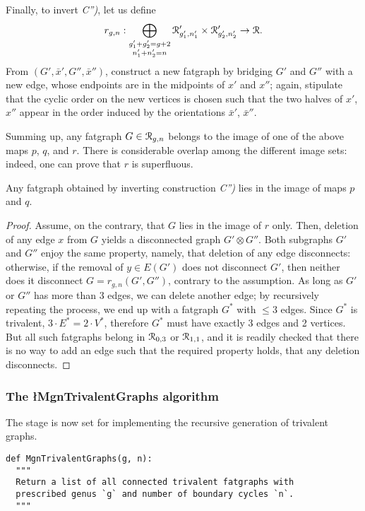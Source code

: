 Finally, to invert {\sl C'')}, let us define
\begin{equation*}
r_{g,n}: \bigoplus_{\substack{g'_1+g'_2=g+2 \\ n'_1+n'_2=n}} 
\mathcal{R}'_{g'_1, n'_1} \times \mathcal{R}'_{g'_2, n'_2} \to \mathcal{R}.
\end{equation*}
From $(G', \bar{x}', G'',
\bar{x}'')$, construct a new fatgraph by bridging $G'$ and $G''$ with
a new edge, whose endpoints are in the midpoints of $x'$ and $x''$;
again, stipulate that the cyclic order on the new vertices is chosen
such that the two halves of $x'$, $x''$ appear in the order induced by
the orientations $\bar{x}'$, $\bar{x}''$.

Summing up, any fatgraph $G \in \mathcal{R}_{g,n}$ belongs to the image of one
of the above maps $p$, $q$, and $r$. There is considerable
overlap among the different image sets: indeed, one can prove that
$r$ is superfluous.
\begin{lemma}\label{lemma:no-c2}
  Any fatgraph obtained by inverting construction {\sl C'')} lies in
  the image of maps $p$ and $q$.
\end{lemma}
\begin{proof}
  Assume, on the contrary, that $G$ lies in the image of $r$ only.
  Then, deletion of any edge $x$ from $G$ yields a disconnected graph
  $G' \otimes G''$.  Both subgraphs $G'$ and $G''$ enjoy the same
  property, namely, that deletion of any edge disconnects: otherwise,
  if the removal of $y \in E(G')$ does not disconnect $G'$, then
  neither does it disconnect $G = r_{g,n}(G', G'')$, contrary to the
  assumption. As long as $G'$ or $G''$ has more than 3 edges, we can
  delete another edge; by recursively repeating the process, we end up
  with a fatgraph $G^*$ with $\leq 3$ edges.  Since $G^*$ is
  trivalent, $3 \cdot E^* = 2 \cdot V^*$, therefore $G^*$ must have
  exactly 3 edges and 2 vertices. But all such fatgraphs belong in
  $\mathcal{R}_{0,3}$ or $\mathcal{R}_{1,1}$, and it is readily checked that there is no
  way to add an edge such that the required property holds, that any
  deletion disconnects.
\end{proof}

\subsubsection{The \l{MgnTrivalentGraphs} algorithm}
\label{sec:MgnTrivalentGraphs}

The stage is now set for implementing the recursive generation of
trivalent graphs.
\begin{lstlisting}[name=MgnTrivalentGraphs,firstnumber=1]
def MgnTrivalentGraphs(g, n):
  """
  Return a list of all connected trivalent fatgraphs with
  prescribed genus `g` and number of boundary cycles `n`.
  """
\end{lstlisting}

